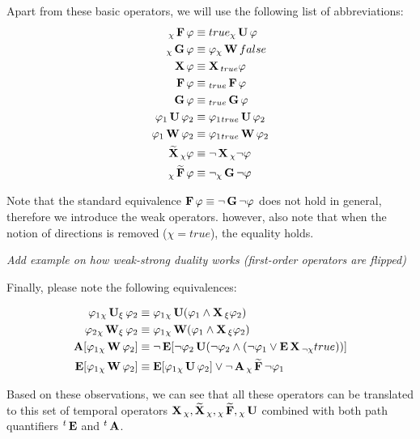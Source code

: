 Apart from these basic operators, we will use the following list of abbreviations:
\begin{align*}
	{}_{\chi}\operatorname{\mathbf{F}} \varphi 				 & \equiv true {}_{\chi}\operatorname{\mathbf{U}} \varphi \\
	{}_{\chi}\operatorname{\mathbf{G}} \varphi 				& \equiv \varphi {}_{\chi}\operatorname{\mathbf{W}} false \\
	\operatorname{\mathbf{X}} \varphi							& \equiv \operatorname{\mathbf{X}}{}_{true} \varphi \\ 
	\operatorname{\mathbf{F}} \varphi 							& \equiv {}_{true}\operatorname{\mathbf{F}} \varphi \\
	\operatorname{\mathbf{G}} \varphi 							& \equiv {}_{true}\operatorname{\mathbf{G}} \varphi  \\
	\varphi_1 \operatorname{\mathbf{U}} \varphi_2 		 & \equiv \varphi_1 {}_{true}\operatorname{\mathbf{U}} \varphi_2 \\
	\varphi_1 \operatorname{\mathbf{W}} \varphi_2 		& \equiv \varphi_1 {}_{true}\operatorname{\mathbf{W}} \varphi_2 \\
	\operatorname{\mathbf{\widetilde{X}}}{}_{\chi} \varphi			  & \equiv \neg \operatorname{\mathbf{X}}{}_{\chi} \neg \varphi \\
	{}_{\chi}\operatorname{\mathbf{\widetilde{F}}} \varphi 			   & \equiv \neg {}_{\chi}\operatorname{\mathbf{G}} \neg \varphi \\
\end{align*}

Note that the standard equivalence $\operatorname{\mathbf{F}} \varphi \equiv \neg \operatorname{\mathbf{G}} \neg \varphi$ does not hold in general, therefore we introduce the weak operators. however, also note that when the notion of directions is removed ($\chi = true$), the equality holds. 

\emph{Add example on how weak-strong duality works (first-order operators are flipped)}

Finally, please note the following equivalences:

\begin{align*}
	\varphi_1 {}_{\chi}\operatorname{\mathbf{U}}_{\xi} \varphi_2						& \equiv \varphi_1 {}_{\chi}\operatorname{\mathbf{U}} (\varphi_1 \land \operatorname{\mathbf{X}}{}_{\xi} \varphi_2)  \\
	\varphi_2 {}_{\chi}\operatorname{\mathbf{W}}_{\xi} \varphi_2 				   & \equiv \varphi_1 {}_{\chi}\operatorname{\mathbf{W}} (\varphi_1 \land \operatorname{\mathbf{X}}{}_{\xi} \varphi_2) \\
	\operatorname{\mathbf{A}}[\varphi_1 {}_{\chi}\operatorname{\mathbf{W}} \varphi_2] 				  & \equiv \neg \operatorname{\mathbf{E}}[ \neg \varphi_2 \operatorname{\mathbf{U}} (\neg \varphi_2 \land (\neg \varphi_1 \lor \operatorname{\mathbf{E}} \operatorname{\mathbf{X}}{}_{\neg\chi} true)) ] \\
	\operatorname{\mathbf{E}}[\varphi_1 {}_{\chi}\operatorname{\mathbf{W}} \varphi_2] 				  & \equiv \operatorname{\mathbf{E}}[\varphi_1 {}_{\chi}\operatorname{\mathbf{U}} \varphi_2] \lor \neg \operatorname{\mathbf{A}} {}_{\chi}\operatorname{\mathbf{\widetilde{F}}} \neg \varphi_1 \\
\end{align*}

Based on these observations, we can see that all these operators can be translated to this set of temporal operators $\operatorname{\mathbf{X}}{}_{\chi}, \operatorname{\mathbf{\widetilde{X}}}{}_{\chi}, {}_{\chi}\operatorname{\mathbf{\widetilde{F}}}, {}_{\chi}\operatorname{\mathbf{U}}$ combined with both path quantifiers ${}^{t}\operatorname{\mathbf{E}}$ and ${}^{t}\operatorname{\mathbf{A}}$.


